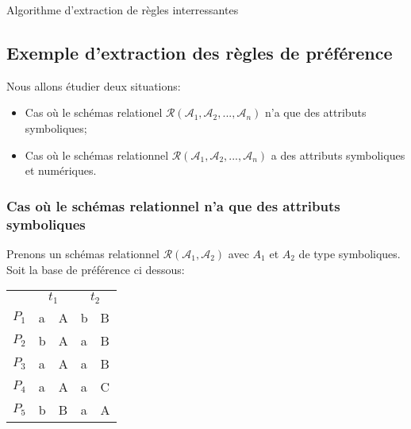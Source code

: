 \documentclass[11pt,a4paper]{article}
\theoremstyle{definition}
\begin{document}
\begin{algorithm}[H]


	
	\caption{Algorithme d'extraction de règles interressantes}
\end{algorithm}




	



   
   
   \subsection{Exemple d'extraction des règles de préférence}
   Nous allons étudier deux situations:
   \begin{itemize}
   		\item Cas où le schémas relationel $\mathcal{R}(\mathcal{A}_{1},\mathcal{A}_{2},...,\mathcal{A}_{n})$ n'a que des attributs symboliques;
   		\item Cas où le schémas relationnel $\mathcal{R}(\mathcal{A}_{1},\mathcal{A}_{2},...,\mathcal{A}_{n})$ a des attributs symboliques et numériques.\\
   \end{itemize}
   
  \subsubsection{ Cas où le schémas relationnel  n'a que des attributs symboliques}
     Prenons un schémas relationnel $\mathcal{R}(\mathcal{A}_{1},\mathcal{A}_{2})$ avec $A_{1}$ et $A_{2}$ de type symboliques. Soit la base de préférence ci dessous:
     \begin{center}
     \begin{tabular}{l|l|l|l|l| } 
     
      &\multicolumn{2}{c|}{$t_{1}$} & \multicolumn{2}{c|}{$t_{2}$}\\
     \cline{2-5}
  		$P_{1}$ & a & A & b & B\\
  		$P_{2}$ & b & A & a & B\\
  		$P_{3}$ & a & A & a & B\\
  		$P_{4}$ & a & A & a & C\\
  		$P_{5}$ & b & B & a & A\\
  	\cline{2-5}
     \end{tabular}
     \end{center}   
     
\end{document}
